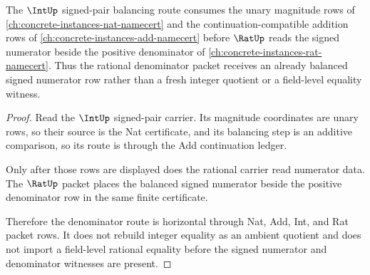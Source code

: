 \begin{theorem}
\label{thm:int-rat-additive-denominator-route}
The $\IntUp$ signed-pair balancing route consumes the unary magnitude rows of \autoref{ch:concrete-instances-nat-namecert} and the continuation-compatible addition rows of \autoref{ch:concrete-instances-add-namecert} before $\RatUp$ reads the signed numerator beside the positive denominator of \autoref{ch:concrete-instances-rat-namecert}. Thus the rational denominator packet receives an already balanced signed numerator row rather than a fresh integer quotient or a field-level equality witness.
\end{theorem}
\begin{proof}
Read the $\IntUp$ signed-pair carrier. Its magnitude coordinates are unary rows, so their source is the Nat certificate, and its balancing step is an additive comparison, so its route is through the Add continuation ledger.

Only after those rows are displayed does the rational carrier read numerator data. The $\RatUp$ packet places the balanced signed numerator beside the positive denominator row in the same finite certificate.

Therefore the denominator route is horizontal through Nat, Add, Int, and Rat packet rows. It does not rebuild integer equality as an ambient quotient and does not import a field-level rational equality before the signed numerator and denominator witnesses are present.
\end{proof}
